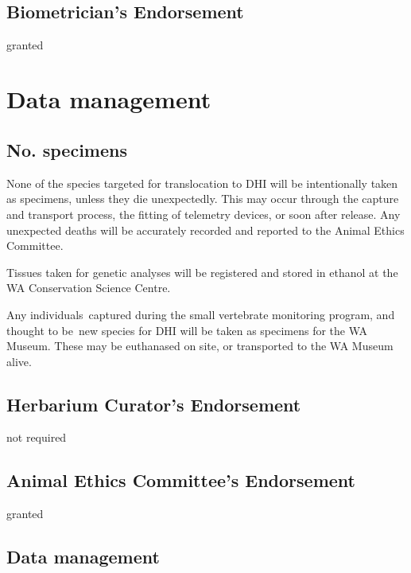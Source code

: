 \documentclass[version=last,
    paper=a4,                               %
    10pt,                                   %
    dvipsnames,
    oneside,                              %
    headings=openany,                       %
    open=any,
    BCOR=7mm,                               %
    DIV=15,     %
]{scrbook}
\begin{document}
~

~

~

~




\subsection*{Biometrician's Endorsement}

granted



\section*{Data management}


\subsection*{No. specimens}

None of the species targeted for translocation to DHI will be
intentionally taken as specimens, unless they die unexpectedly. This may
occur through the capture and transport process, the fitting of
telemetry devices, or soon after release. Any unexpected deaths will be
accurately recorded and reported to the Animal Ethics Committee.

Tissues taken for genetic analyses will be registered and stored in
ethanol at the WA Conservation Science Centre.

Any individuals~captured during the small vertebrate monitoring program,
and thought to be~new species for DHI will be taken as specimens for the
WA Museum. These may be euthanased on site, or transported to the WA
Museum alive.




\subsection*{Herbarium Curator's Endorsement}

not required




\subsection*{Animal Ethics Committee's Endorsement}

granted




\subsection*{Data management}
\end{document}
